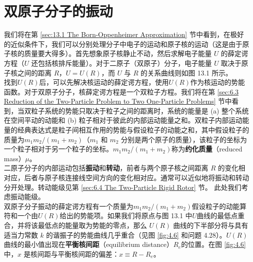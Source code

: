 \section{双原子分子的振动}
\label{sec:4.3 Vibrations of Diatomic Molecules}
    我们将在第 \ref{sec:13.1 The Born-Oppenheimer Approximation} 节中看到，在极好的近似条件下，我们可以分别处理分子中电子的运动和原子核的运动（这是由于原子核的质量要大得多）。首先想象原子核静止不动，然后求解电子能量 $U$ 的薛定谔方程（$U$ 还包括核排斥能量）。对于二原子（双原子）分子，电子能量 $U$ 取决于原子核之间的距离 $R$，$U=U\left(R\right)$，而 $U$ 与 $R$ 的关系曲线则如图 13.1 所示。\\
    \indent 找到$U\left(R\right)$后，可以先解决核运动的薛定谔方程，使用$U\left(R\right)$作为核运动的势能函数。对于双原子分子，核薛定谔方程是一个双粒子方程。我们将在第 \ref{sec:6.3 Reduction of the Two-Particle Problem to Two One-Particle Problems} 节中看到，当双粒子系统的势能只取决于粒子之间的距离时，系统的能量是 (a) 整个系统在空间平动的动能和 (b) 粒子相对于彼此的内部运动能量之和。双粒子内部运动能量的经典表达式是粒子间相互作用的势能与假设粒子的动能之和，其中假设粒子的质量为$m_1m_2/\left(m_1+m_2\right)$（$m_1$ 和 $m_2$ 分别是两个原子的质量），该粒子的坐标为一个粒子相对于另一个粒子的坐标。$m_1m_2/\left(m_1+m_2\right)$称为\textbf{约化质量}（reduced mass）$\mu$。\\
    \indent 二原子分子的内部运动包括\textbf{振动}和\textbf{转动}，前者与两个原子核之间距离 $R$ 的变化相对应，后者与原子核连接线空间方向的变化相对应。通常可以近似地将振动和转动分开处理。转动能级见第 \ref{sec:6.4 The Two-Particle Rigid Rotor} 节。 此处我们考虑振动能级。\\
    \indent 双原子分子振动的薛定谔方程有一个质量为$m_1m_2/\left(m_1+m_2\right)$假设粒子的动能算符和一个由$U\left(R\right)$给出的势能项。如果我们将原点与图 13.1 中$U$曲线的最低点重合，并将该最低点的能量取为势能的零点，那么 $U(R)$ 曲线的下半部分将与具有适当力常数 $k$ 的谐振子的势能曲线几乎重合（见图 \ref{fig:4.6} 和问题 4.28）。$U(R)$ 曲线的最小值出现在\textbf{平衡核间距}（equilibrium distance）$R_e$的位置。在图 \ref{fig:4.6} 中，$x$ 是核间距与平衡核间距的偏差：$x \equiv R - R_e$。
